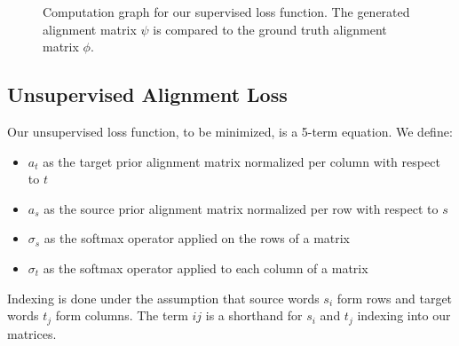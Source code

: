 \documentclass[twoside,twocolumn]{article}
\begin{document}
\begin{figure}
  \centering
  \caption{Computation graph for our supervised loss function. The generated alignment matrix $\psi$ is compared to the ground truth alignment matrix $\phi$.}
  \label{fig:supervised_loss}
\end{figure}

\subsection{Unsupervised Alignment Loss}


Our unsupervised loss function, to be minimized, is a 5-term equation. We define:
\begin{itemize}[label={}]
  \item $a_t$ as the target prior alignment matrix normalized per column with respect to $t$\\ %
  \item $a_s$ as the source prior alignment matrix normalized per row with respect to $s$\\ %
  \item $\sigma_s$ as the softmax operator applied on the rows of a matrix\\
  \item $\sigma_t$ as the softmax operator applied to each column of a matrix
\end{itemize}

Indexing is done under the assumption that source words $s_i$ form rows
and target words $t_j$ form columns. The term $ij$ is a shorthand
for $s_i$ and $t_j$ indexing into our matrices.
\end{document}
